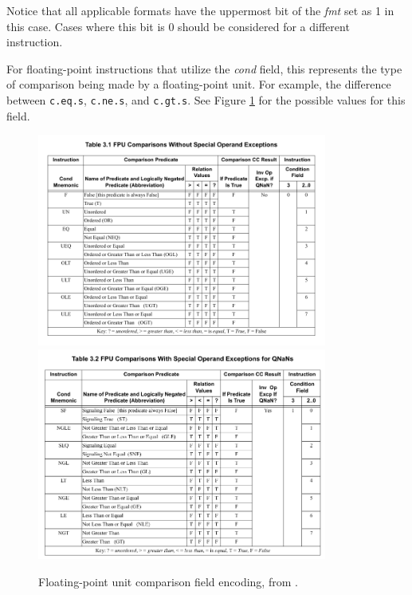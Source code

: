 \documentclass[
    paper=letter,
    parskip=half,
    fontsize=12pt,
    titlepage=firstiscover,
    toc=bibliography,
    numbers=endperiod
]{scrartcl}
\begin{document}
Notice that all applicable formats have the uppermost bit of the
\emph{fmt} set as 1 in this case. Cases where this bit is 0 should be
considered for a different instruction.

For floating-point instructions that utilize the \emph{cond} field, this
represents the type of comparison being made by a floating-point unit.
For example, the difference between \texttt{c.eq.s}, \texttt{c.ne.s},
and \texttt{c.gt.s}. See Figure \ref{fig:fpu-cond-encoding} for the
possible values for this field.

\begin{figure}[H]
    \begin{minipage}{\textwidth}
        \begin{center}
            \includegraphics[width=0.85\textwidth]{fpu-cond-encoding-1}
            \includegraphics[width=0.85\textwidth]{fpu-cond-encoding-2}
        \end{center}
    \end{minipage}
    \caption{Floating-point unit comparison field encoding, from \protect\cite{mips-specification}.}
    \label{fig:fpu-cond-encoding}
\end{figure}
\end{document}

